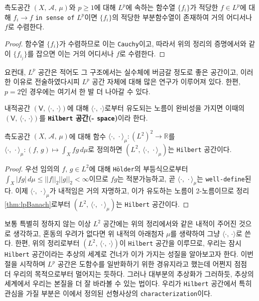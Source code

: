 \begin{corollary}\label{cor:lpBanach}
    측도공간 $(X,\,\mathcal{A},\,\mu)$와 $p\geq1$에 대해 $L^p$에 속하는 함수열 $\{f_i\}$가 적당한 $f\in L^p$에 대해 $f_i\to f$ \texttt{in sense of} $L^p$이면 $\{f_i\}$의 적당한 부분함수열이 존재하여 거의 어디서나 $f$로 수렴한다.
\end{corollary}

\begin{proof}
    함수열 $\{f_i\}$가 수렴하므로 이는 \texttt{Cauchy}이고, 따라서 위의 정리의 증명에서와 같이 $\{f_{i_j}\}$를 잡으면 이는 거의 어디서나 $f$로 수렴한다.
\end{proof}

요컨대, $L^p$ 공간은 적어도 그 구조에서는 실수체에 버금갈 정도로 좋은 공간이고, 이러한 이유로 전술하였다시피 $L^p$ 공간 자체에 대해 많은 연구가 이루어져 있다. 한편, $p=2$인 경우에는 여기서 한 발 더 나아갈 수 있다.

\begin{definition}
    내적공간 $(\mathsf{V},\,\langle\cdot,\,\cdot\rangle)$에 대해 $\langle\cdot,\,\cdot\rangle$로부터 유도되는 노름이 완비성을 가지면 이때의 $(\mathsf{V},\,\langle\cdot,\,\cdot\rangle)$를 \textbf{\texttt{Hilbert} 공간(- \texttt{space})}이라 한다.
\end{definition}

\begin{theorem}\label{thm:lpHilbert}
    측도공간 $(X,\,\mathcal{A},\,\mu)$에 대해 함수 $\langle\cdot,\,\cdot\rangle_\mu:(L^2)^2\to\mathbb{R}$를 $\langle\cdot,\,\cdot\rangle_\mu:(f,\,g)\mapsto\int_Xfg\,d\mu$로 정의하면 $(L^2,\,\langle\cdot,\,\cdot\rangle_\mu)$는 \texttt{Hilbert} 공간이다.
\end{theorem}

\begin{proof}
    우선 임의의 $f,\,g\in L^2$에 대해 \texttt{H\"older}의 부등식으로부터 $\int_X|fg|\,d\mu\leq||f||_2||g||_2<\infty$이므로 $fg$는 적분가능하고, 곧 $\langle\cdot,\,\cdot\rangle_\mu$는 \texttt{well-define}된다. 이제 $\langle\cdot,\,\cdot\rangle_\mu$가 내적임은 거의 자명하고, 이가 유도하는 노름이 2-노름이므로 정리 \ref{thm:lpBanach}로부터 $(L^2,\,\langle\cdot,\,\cdot\rangle_\mu)$는 \texttt{Hilbert} 공간이다.
\end{proof}

보통 특별히 정하지 않는 이상 $L^2$ 공간에는 위의 정리에서와 같은 내적이 주어진 것으로 생각하고, 혼동의 우려가 없다면 위 내적의 아래첨자 $\mu$를 생략하여 그냥 $\langle\cdot,\,\cdot\rangle$로 쓴다. 한편, 위의 정리로부터 $(L^2,\,\langle\cdot,\,\cdot\rangle)$이 \texttt{Hilbert} 공간을 이루므로, 우리는 잠시  \texttt{Hilbert} 공간이라는 추상의 세계로 건너가 이가 가지는 성질을 알아보고자 한다. 이번 절을 시작하며 $L^p$ 공간은 도함수를 일반화하기 위한 경유지라고 했는데 어쩐지 점점 더 우리의 목적으로부터 멀어지는 듯하다. 그러나 대부분의 추상화가 그러하듯, 추상의 세계에서 우리는 본질을 더 잘 바라볼 수 있는 법이다. 우리가 \texttt{Hilbert} 공간에서 특히 관심을 가질 부분은 이에서 정의된 선형사상의 \texttt{characterization}이다.

